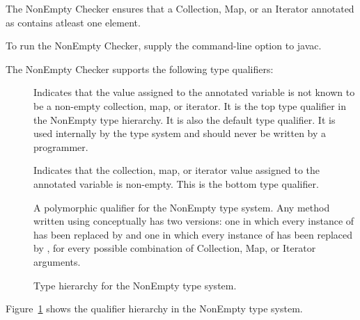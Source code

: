 \htmlhr
{}

The NonEmpty Checker ensures that a Collection, Map, or an Iterator annotated as
 contains atleast one element.

To run the NonEmpty Checker, supply the
command-line option to javac.

The NonEmpty Checker supports the following type qualifiers:
\begin{description}

    \item[]
    Indicates that the value assigned to the annotated variable is not known to be a non-empty
    collection, map, or iterator. It is the top type qualifier in the NonEmpty type hierarchy. It is also the default type
    qualifier.
    It is used internally by the type system and should never be written by a programmer.

    \item[]
    Indicates that the collection, map, or iterator value assigned to the annotated variable is non-empty.
    This is the bottom type qualifier.

    \item[]
    A polymorphic qualifier for the NonEmpty type system.
    Any method written using  conceptually has two
    versions: one in which every instance of  has been replaced by
     and one in which every instance of
     has been replaced by , for every possible
    combination of Collection, Map, or Iterator arguments.

\end{description}

\begin{figure}
    \caption{Type hierarchy for the NonEmpty type system.}
    \label{fig-nonempty-hierarchy}
\end{figure}

Figure~\ref{fig-nonempty-hierarchy} shows the qualifier hierarchy in the NonEmpty type system.
